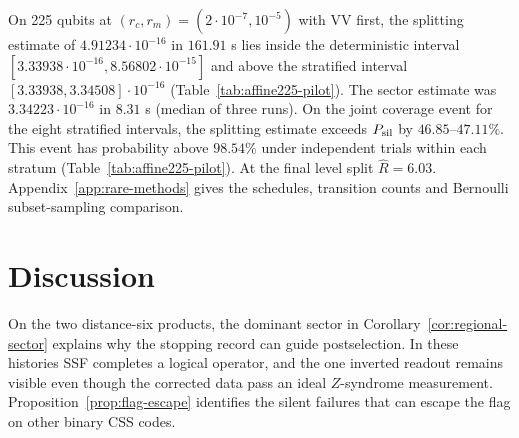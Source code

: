 \documentclass[10pt,twocolumn]{article}
\theoremstyle{definition}
\begin{document}
On 225 qubits at $(r_c,r_m)=(2\cdot10^{-7},10^{-5})$ with VV first,
the splitting estimate of $4.91234\cdot10^{-16}$ in $161.91$ s lies
inside the deterministic interval
$[3.33938\cdot10^{-16},8.56802\cdot10^{-15}]$
and above the stratified interval $[3.33938,3.34508]\cdot10^{-16}$
(Table~\ref{tab:affine225-pilot}). The sector estimate
was $3.34223\cdot10^{-16}$ in $8.31$ s (median of three runs).
On the joint coverage event for the eight stratified intervals, the
splitting estimate exceeds $P_{\rm sil}$ by $46.85$--$47.11\%$. This
event has probability above $98.54\%$ under independent trials within
each stratum (Table~\ref{tab:affine225-pilot}). At the final level
split $\widehat R=6.03$. Appendix~\ref{app:rare-methods} gives the
schedules, transition counts and Bernoulli subset-sampling comparison.

\section{Discussion}\label{sec:limits}\label{sec:conclusion}
On the two distance-six products, the dominant sector in
Corollary~\ref{cor:regional-sector} explains why the stopping record
can guide postselection. In these histories SSF completes a logical
operator, and the one inverted readout remains visible even though
the corrected data pass an ideal $Z$-syndrome measurement.
Proposition~\ref{prop:flag-escape} identifies the silent failures that
can escape the flag on other binary CSS codes.
\end{document}

